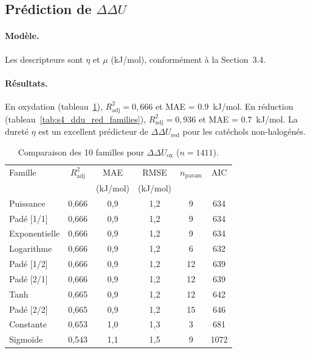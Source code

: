 \subsection{Prédiction de \texorpdfstring{$\Delta\Delta U$}{DDU}}
\label{subsec:s4_ddu}

\paragraph{Modèle.}
Les descripteurs sont $\eta$ et $\mu$ (kJ/mol), conformément à la Section~3.4.

\paragraph{Résultats.}
En oxydation (tableau~\ref{tab:s4_ddu_ox_families}), $R^2_\text{adj} = 0{,}666$ et MAE = \SI{0.9}{kJ/mol}. En réduction (tableau~\ref{tab:s4_ddu_red_families}), $R^2_\text{adj} = 0{,}936$ et MAE = \SI{0.7}{kJ/mol}. La dureté $\eta$ est un excellent prédicteur de $\Delta\Delta U_\text{red}$ pour les catéchols non-halogénés.

\begin{table}[htbp]
\centering
\footnotesize
\caption{Comparaison des 10 familles pour $\Delta\Delta U_{\mathrm{ox}}$ ($n = 1411$).}
\label{tab:s4_ddu_ox_families}
\begin{tabular}{lccccc}
\toprule
Famille & $R^2_{\mathrm{adj}}$ & MAE & RMSE & $n_{\mathrm{param}}$ & AIC \\
 & & (kJ/mol) & (kJ/mol) & & \\
\midrule
Puissance & 0,666 & 0,9 & 1,2 & 9 & 634 \\
Padé [1/1] & 0,666 & 0,9 & 1,2 & 9 & 634 \\
Exponentielle & 0,666 & 0,9 & 1,2 & 9 & 634 \\
Logarithme & 0,666 & 0,9 & 1,2 & 6 & 632 \\
Padé [1/2] & 0,666 & 0,9 & 1,2 & 12 & 639 \\
Padé [2/1] & 0,666 & 0,9 & 1,2 & 12 & 639 \\
Tanh & 0,665 & 0,9 & 1,2 & 12 & 642 \\
Padé [2/2] & 0,665 & 0,9 & 1,2 & 15 & 646 \\
Constante & 0,653 & 1,0 & 1,3 & 3 & 681 \\
Sigmoïde & 0,543 & 1,1 & 1,5 & 9 & 1072 \\
\bottomrule
\end{tabular}
\end{table}

